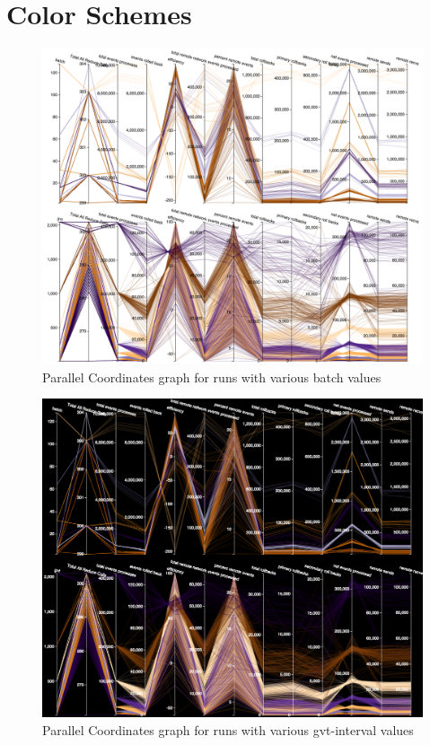 \documentclass[12pt]{article}
\begin{document}
\section{Color Schemes}
\begin{figure}[ht]
\centering
	\includegraphics[width=7in]{figures/blind-white.png}
\caption{Parallel Coordinates graph for runs with various batch values}
\label{fig:batch}
\end{figure}
\begin{figure}[ht]
\centering
	\includegraphics[width=7in]{figures/blind-black.png}
\caption{Parallel Coordinates graph for runs with various gvt-interval values}
\label{fig:gvt}
\end{figure}
\end{document}
